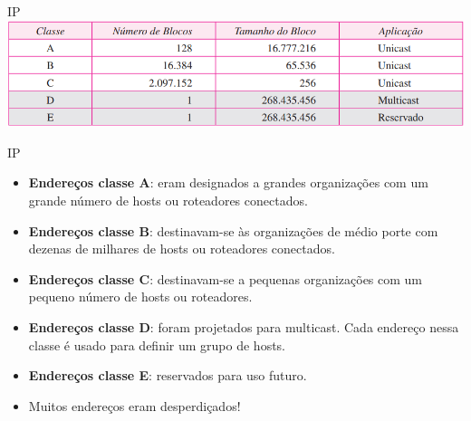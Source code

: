 \documentclass{libs/ufc_format}
\begin{document}
\begin{frame}{IP}
    \centering
    \includegraphics[scale=0.45]{figuras/figura06_05}
\end{frame}

\begin{frame}{IP}
    \begin{itemize}
        \justifying
        \item \textbf{Endereços classe A}: eram designados a grandes organizações com um grande número de hosts ou roteadores conectados.
        \item \textbf{Endereços classe B}: destinavam-se às organizações de médio porte com dezenas de milhares de hosts ou roteadores conectados.
        \item \textbf{Endereços classe C}: destinavam-se a pequenas organizações com um pequeno número de hosts ou roteadores.
        \item \textbf{Endereços classe D}: foram projetados para multicast. Cada endereço nessa classe é usado para definir um grupo de hosts.
        \item \textbf{Endereços classe E}: reservados para uso futuro.
        \vspace{1cm}
        \item Muitos endereços eram desperdiçados!
    \end{itemize}
\end{frame}
\end{document}
